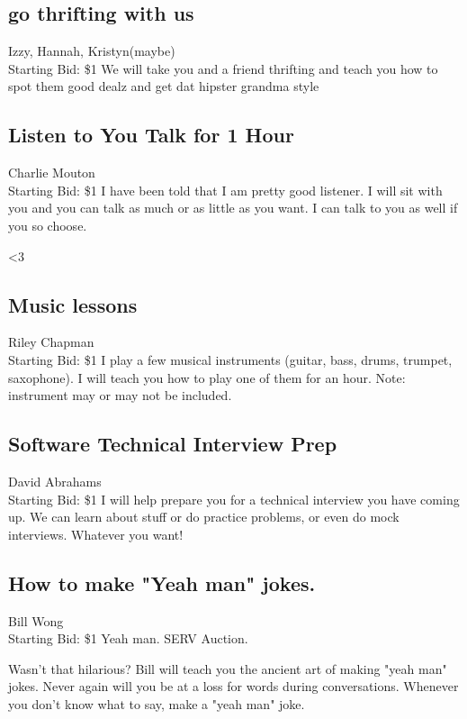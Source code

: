 \documentclass[11pt]{article}
\begin{document}
\subsection{go thrifting with us}
Izzy, Hannah, Kristyn(maybe)
\\
Starting Bid: \$1
\newline
We will take you  and a friend thrifting and teach you how to spot them good dealz and get dat hipster grandma style
\subsection{Listen to You Talk for 1 Hour}
Charlie Mouton
\\
Starting Bid: \$1
\newline
I have been told that I am pretty good listener. I will sit with you and you can talk as much or as little as you want. I can talk to you as well if you so choose.

\textless 3
\subsection{Music lessons}
Riley Chapman
\\
Starting Bid: \$1
\newline
I play a few musical instruments (guitar, bass, drums, trumpet, saxophone). I will teach you how to play one of them for an hour. Note: instrument may or may not be included.
\subsection{Software Technical Interview Prep}
David Abrahams
\\
Starting Bid: \$1
\newline
I will help prepare you for a technical interview you have coming up. We can learn about stuff or do practice problems, or even do mock interviews. Whatever you want!
\subsection{How to make "Yeah man" jokes.}
Bill Wong
\\
Starting Bid: \$1
\newline
Yeah man. SERV Auction.

Wasn't that hilarious? Bill will teach you the ancient art of making "yeah man" jokes. Never again will you be at a loss for words during conversations. Whenever you don't know what to say, make a "yeah man" joke.
\end{document}
